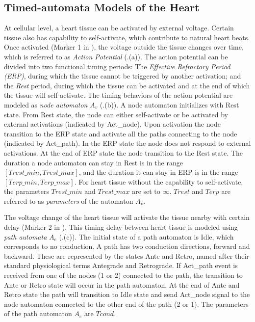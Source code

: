 \subsection{Timed-automata Models of the Heart}
At cellular level, a heart tissue can be activated by external voltage. Certain tissue also has capability to self-activate, which contribute to natural heart beats. Once activated (Marker 1 in ), the voltage outside the tissue changes over time, which is referred to as \emph{Action Potential} (.(a)). 
The action potential can be divided into two functional timing periods: The \emph{Effective Refractory Period (ERP)}, during which the tissue cannot be triggered by another activation; and the \emph{Rest} period, during which the tissue can be activated and at the end of which the tissue will self-activate. 
The timing behaviors of the action potential are modeled as \emph{node automaton} $A_v$ (.(b)). 
A node automaton initializes with \textsf{Rest} state.
From \textsf{Rest} state, the node can either self-activate or be activated by external activations (indicated by Act\_node). 
Upon activation the node transition to the \textsf{ERP} state and activate all the paths connecting to the node (indicated by Act\_path). 
In the \textsf{ERP} state the node does not respond to external activations. 
At the end of \textsf{ERP} state the node transition to the \textsf{Rest} state. 
The duration a node automaton can stay in \textsf{Rest} is in the range $[Trest\_min,Trest\_max]$, and the duration it can stay in \textsf{ERP} is in the range $[Terp\_min, Terp\_max]$.
For heart tissue without the capability to self-activate, the parameters $Trest\_min$ and $Trest\_max$ are set to $\infty$.
$Trest$ and $Terp$ are referred to as \emph{parameters} of the automaton $A_v$.

The voltage change of the heart tissue will activate the tissue nearby with certain delay (Marker 2 in ). 
This timing delay between heart tissue is modeled using \emph{path automata} $A_e$ (.(c)). 
The initial state of a path automaton is \textsf{Idle}, which corresponds to no conduction. 
A path has two conduction directions, forward and backward.
These are represented by the states \textsf{Ante} and \textsf{Retro}, named after their standard physiological terms Antegrade and Retrograde.
If \textsf{Act\_path} event is received from one of the nodes (1 or 2) connected to the path, the transition to \textsf{Ante} or \textsf{Retro} state will occur in the path automaton. 
At the end of \textsf{Ante} and \textsf{Retro} state the path will transition to \textsf{Idle} state and send Act\_node signal to the node automaton connected to the other end of the path (2 or 1).
The parameters of the path automaton $A_e$ are $Tcond$.


